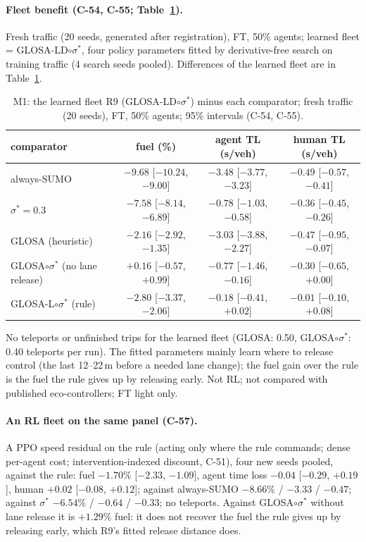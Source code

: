 \documentclass[11pt]{article}
\begin{document}
\paragraph{Fleet benefit (C-54, C-55; Table~\ref{tab:m1}).} Fresh traffic (20 seeds, generated after registration), FT, 50\% agents; learned
fleet = GLOSA-LD$\circ\sigma^*$, four policy parameters fitted by derivative-free search on training traffic (4 search seeds pooled).
Differences of the learned fleet are in Table~\ref{tab:m1}.
\begin{table}[t]\centering\small
\caption{M1: the learned fleet R9 (GLOSA-LD$\circ\sigma^*$) minus each comparator; fresh traffic (20 seeds), FT, 50\% agents; 95\%
intervals (C-54, C-55).}\label{tab:m1}
\begin{tabular}{lccc}\toprule
comparator & fuel (\%) & agent TL (s/veh) & human TL (s/veh)\\\midrule
always-SUMO & $-9.68$ [$-10.24$, $-9.00$] & $-3.48$ [$-3.77$, $-3.23$] & $-0.49$ [$-0.57$, $-0.41$]\\
$\sigma^*=0.3$ & $-7.58$ [$-8.14$, $-6.89$] & $-0.78$ [$-1.03$, $-0.58$] & $-0.36$ [$-0.45$, $-0.26$]\\
GLOSA (heuristic) & $-2.16$ [$-2.92$, $-1.35$] & $-3.03$ [$-3.88$, $-2.27$] & $-0.47$ [$-0.95$, $-0.07$]\\
GLOSA$\circ\sigma^*$ (no lane release) & $+0.16$ [$-0.57$, $+0.99$] & $-0.77$ [$-1.46$, $-0.16$] & $-0.30$ [$-0.65$, $+0.00$]\\
GLOSA-L$\circ\sigma^*$ (rule) & $-2.80$ [$-3.37$, $-2.06$] & $-0.18$ [$-0.41$, $+0.02$] & $-0.01$ [$-0.10$, $+0.08$]\\\bottomrule
\end{tabular}\end{table}
No teleports or unfinished trips for the learned fleet (GLOSA: 0.50, GLOSA$\circ\sigma^*$: 0.40 teleports per run). The fitted
parameters mainly learn where to release control (the last 12--22\,m before a needed lane change); the fuel gain over the rule is the
fuel the rule gives up by releasing early. Not RL; not compared with published eco-controllers; FT light only.
\paragraph{An RL fleet on the same panel (C-57).} A PPO speed residual on the rule (acting only where the rule commands; dense per-agent
cost; intervention-indexed discount, C-51), four new seeds pooled, against the rule: fuel $-1.70\%$ [$-2.33$, $-1.09$], agent time loss
$-0.04$ [$-0.29$, $+0.19$], human $+0.02$ [$-0.08$, $+0.12$]; against always-SUMO $-8.66\%$ / $-3.33$ / $-0.47$; against $\sigma^*$
$-6.54\%$ / $-0.64$ / $-0.33$; no teleports. Against GLOSA$\circ\sigma^*$ without lane release it is $+1.29\%$ fuel: it does not recover the fuel the
rule gives up by releasing early, which R9's fitted release distance does.
\end{document}

